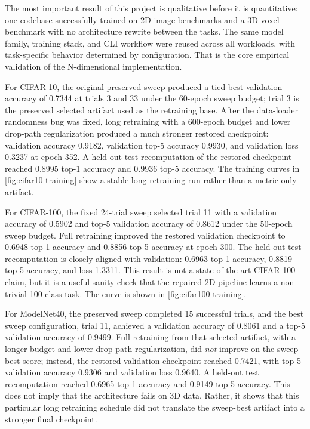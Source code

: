 The most important result of this project is qualitative before it is quantitative: one codebase successfully trained on 2D image benchmarks and a 3D voxel benchmark with no architecture rewrite between the tasks. The same model family, training stack, and CLI workflow were reused across all workloads, with task-specific behavior determined by configuration. That is the core empirical validation of the N-dimensional implementation.

For CIFAR-10, the original preserved sweep produced a tied best validation accuracy of 0.7344 at trials 3 and 33 under the 60-epoch sweep budget; trial 3 is the preserved selected artifact used as the retraining base. After the data-loader randomness bug was fixed, long retraining with a 600-epoch budget and lower drop-path regularization produced a much stronger restored checkpoint: validation accuracy 0.9182, validation top-5 accuracy 0.9930, and validation loss 0.3237 at epoch 352. A held-out test recomputation of the restored checkpoint reached 0.8995 top-1 accuracy and 0.9936 top-5 accuracy. The training curves in \autoref{fig:cifar10-training} show a stable long retraining run rather than a metric-only artifact.

For CIFAR-100, the fixed 24-trial sweep selected trial 11 with a validation accuracy of 0.5902 and top-5 validation accuracy of 0.8612 under the 50-epoch sweep budget. Full retraining improved the restored validation checkpoint to 0.6948 top-1 accuracy and 0.8856 top-5 accuracy at epoch 300. The held-out test recomputation is closely aligned with validation: 0.6963 top-1 accuracy, 0.8819 top-5 accuracy, and loss 1.3311. This result is not a state-of-the-art CIFAR-100 claim, but it is a useful sanity check that the repaired 2D pipeline learns a non-trivial 100-class task. The curve is shown in \autoref{fig:cifar100-training}.

For ModelNet40, the preserved sweep completed 15 successful trials, and the best sweep configuration, trial 11, achieved a validation accuracy of 0.8061 and a top-5 validation accuracy of 0.9499. Full retraining from that selected artifact, with a longer budget and lower drop-path regularization, did \emph{not} improve on the sweep-best score; instead, the restored validation checkpoint reached 0.7421, with top-5 validation accuracy 0.9306 and validation loss 0.9640. A held-out test recomputation reached 0.6965 top-1 accuracy and 0.9149 top-5 accuracy. This does not imply that the architecture fails on 3D data. Rather, it shows that this particular long retraining schedule did not translate the sweep-best artifact into a stronger final checkpoint.

